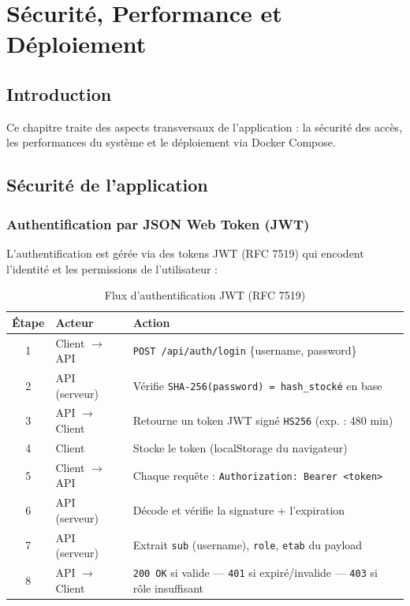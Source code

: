 \documentclass[12pt,a4paper]{report}
\begin{document}
	\chapter{Sécurité, Performance et Déploiement}
	
	\section{Introduction}
	
	Ce chapitre traite des aspects transversaux de l'application : la sécurité des accès,
	les performances du système et le déploiement via Docker Compose.
	
	\section{Sécurité de l'application}
	
	\subsection{Authentification par JSON Web Token (JWT)}
	
	L'authentification est gérée via des tokens JWT (RFC 7519) qui encodent l'identité
	et les permissions de l'utilisateur :
	
	\begin{table}[H]
		\centering
		\caption{Flux d'authentification JWT (RFC 7519)}
		\renewcommand{\arraystretch}{1.3}
		\begin{tabularx}{\textwidth}{clX}
			\toprule
			\textbf{Étape} & \textbf{Acteur} & \textbf{Action} \\
			\midrule
			1 & Client $\to$ API   & \texttt{POST /api/auth/login} \{username, password\} \\
			2 & API (serveur)       & Vérifie \texttt{SHA-256(password) = hash\_stocké} en base \\
			3 & API $\to$ Client   & Retourne un token JWT signé \texttt{HS256} (exp. : 480 min) \\
			4 & Client              & Stocke le token (localStorage du navigateur) \\
			5 & Client $\to$ API   & Chaque requête : \texttt{Authorization: Bearer <token>} \\
			6 & API (serveur)       & Décode et vérifie la signature + l'expiration \\
			7 & API (serveur)       & Extrait \texttt{sub} (username), \texttt{role}, \texttt{etab} du payload \\
			8 & API $\to$ Client   & \texttt{200 OK} si valide — \texttt{401} si expiré/invalide — \texttt{403} si rôle insuffisant \\
			\bottomrule
		\end{tabularx}
	\end{table}
	
\end{document}
